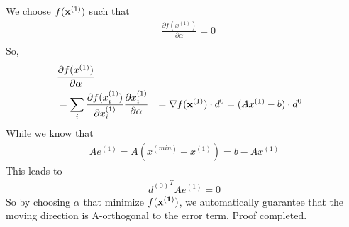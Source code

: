 \documentclass[a4paper]{article}
\begin{document}
We choose $f({\bf x}^{(1) })$ such that
\begin{align*}
& \frac{\partial f(x^{(1)}) }{\partial \alpha}  = 0 \\
\end{align*}
So,
\begin{align*}
& \frac{\partial f(x^{(1)}) }{\partial \alpha} \\
& = \sum_i\frac{\partial f(x_i^{(1)} )}{\partial x_i^{(1)}}\frac{\partial x_i^{(1)} }{\partial \alpha}
& = \nabla f({\bf x}^{(1)}) \cdot d^{0} 
& = (A x^{(1)} - b) \cdot d^{0}
\end{align*}
While we know that
\begin{align*}
	Ae^{(1)} = A(x^{(min)} - x^{(1)})  = b-A x^{(1)}
\end{align*}
This leads to
\begin{align*}
	{d^{(0)}}^T A e^{(1)} = 0
\end{align*}
So by choosing $\alpha$ that minimize $f({\bf x^{(1)}})$, we automatically guarantee that the moving direction is A-orthogonal to the error term. Proof completed. 
\end{document}
